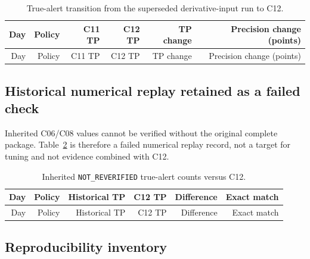 \documentclass[education,supfile,submit,moreauthors]{Definitions/mdpi}
\begin{document}
\small
\begin{longtable}{rrr r r r}
\caption{True-alert transition from the superseded derivative-input run to C12.}\label{tab:s_transition}\\
\toprule
Day & Policy & C11 TP & C12 TP & TP change & Precision change (points) \\
\midrule
\endfirsthead
\toprule
Day & Policy & C11 TP & C12 TP & TP change & Precision change (points) \\
\midrule
\endhead

\end{longtable}
\normalsize

\subsection{Historical numerical replay retained as a failed check}

Inherited C06/C08 values cannot be verified without the original complete package. Table~\ref{tab:s_history} is therefore a failed numerical replay record, not a target for tuning and not evidence combined with C12.

\small
\begin{longtable}{rrr r r r}
\caption{Inherited \texttt{NOT\_REVERIFIED} true-alert counts versus C12.}\label{tab:s_history}\\
\toprule
Day & Policy & Historical TP & C12 TP & Difference & Exact match \\
\midrule
\endfirsthead
\toprule
Day & Policy & Historical TP & C12 TP & Difference & Exact match \\
\midrule
\endhead

\end{longtable}
\normalsize

\subsection{Reproducibility inventory}
\end{document}
